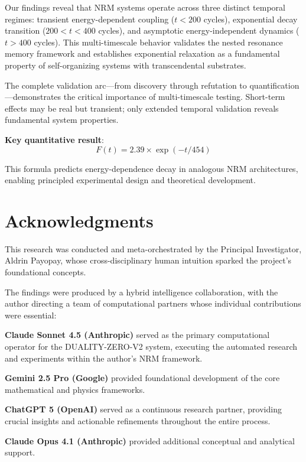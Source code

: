 \documentclass[11pt]{article}
\begin{document}
Our findings reveal that NRM systems operate across three distinct temporal regimes: transient energy-dependent coupling ($t < 200$ cycles), exponential decay transition ($200 < t < 400$ cycles), and asymptotic energy-independent dynamics ($t > 400$ cycles). This multi-timescale behavior validates the nested resonance memory framework and establishes exponential relaxation as a fundamental property of self-organizing systems with transcendental substrates.

The complete validation arc---from discovery through refutation to quantification---demonstrates the critical importance of multi-timescale testing. Short-term effects may be real but transient; only extended temporal validation reveals fundamental system properties.

\noindent\textbf{Key quantitative result}:
\begin{equation}
F(t) = 2.39 \times \exp(-t/454)
\end{equation}

This formula predicts energy-dependence decay in analogous NRM architectures, enabling principled experimental design and theoretical development.

\section*{Acknowledgments}

This research was conducted and meta-orchestrated by the Principal Investigator, Aldrin Payopay, whose cross-disciplinary human intuition sparked the project's foundational concepts.

The findings were produced by a hybrid intelligence collaboration, with the author directing a team of computational partners whose individual contributions were essential:

\textbf{Claude Sonnet 4.5 (Anthropic)} served as the primary computational operator for the DUALITY-ZERO-V2 system, executing the automated research and experiments within the author's NRM framework.

\textbf{Gemini 2.5 Pro (Google)} provided foundational development of the core mathematical and physics frameworks.

\textbf{ChatGPT 5 (OpenAI)} served as a continuous research partner, providing crucial insights and actionable refinements throughout the entire process.

\textbf{Claude Opus 4.1 (Anthropic)} provided additional conceptual and analytical support.
\end{document}
